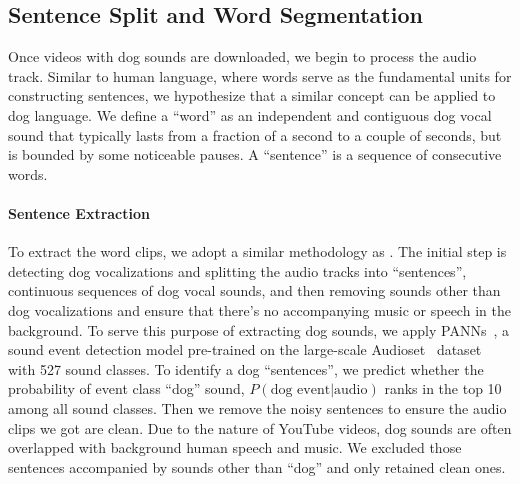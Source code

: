 \subsection{Sentence Split and Word Segmentation}
\label{sec:divide}

Once videos with dog sounds are downloaded, we begin to process the audio
track.  Similar to human language, where words serve as the fundamental units 
for constructing sentences, we hypothesize that a similar concept can be 
applied to dog language. We define a ``word'' as an independent and contiguous dog vocal sound that typically lasts from a fraction of a second to a couple of seconds, but is bounded by
some noticeable pauses. A ``sentence'' is a sequence of consecutive words. 

\paragraph{Sentence Extraction} 
To extract the word clips, we adopt a similar methodology as \citet{jieyiacl2023}.
The initial step is detecting dog vocalizations and splitting the audio tracks into ``sentences'', continuous sequences of dog vocal sounds, and then removing sounds other than dog vocalizations and ensure that there's no accompanying music or speech in the background. 
To serve this purpose of extracting dog sounds, we apply PANNs~\cite{kong2020panns}, a sound event detection model pre-trained 
on the large-scale Audioset~\cite{} dataset with 527 sound classes. 
To identify a dog ``sentences'', we predict whether the probability of event class 
``dog'' sound, ${P (\text{dog event}| \text{audio})}$ ranks in the top 10 among all sound classes.
Then we remove the noisy sentences to ensure the audio clips we got are clean. 
Due to the nature of YouTube videos, dog sounds are often overlapped with 
background human speech and music. We excluded those sentences  accompanied by sounds other than ``dog'' and only retained clean ones. 

